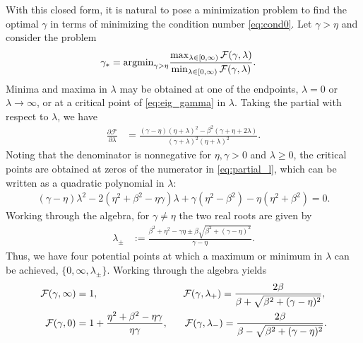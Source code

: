 \documentclass[a4paper,10pt]{article}
\begin{document}
With this closed form, it is natural to pose a minimization problem to find the
optimal $\gamma$ in terms of minimizing the condition number \eqref{eq:cond0}.
Let $\gamma > \eta$ and consider the problem
%
\begin{align}\label{eq:gam_opt}
\gamma_* & = \textnormal{argmin}_{\gamma>\eta}
	\frac{\max_{\lambda\in[0,\infty)} \mathcal{F}(\gamma,\lambda)}
		{\min_{\lambda\in[0,\infty)} \mathcal{F}(\gamma,\lambda)}.
\end{align}
%
Minima and maxima in $\lambda$ may be obtained at one of the endpoints,
$\lambda = 0$ or $\lambda\to\infty$, or at a critical point of \eqref{eq:eig_gamma}
in $\lambda$. Taking the partial with respect to $\lambda$, we have
%
\begin{align}\label{eq:partial_l}
\frac{\partial\mathcal{F}}{\partial\lambda} & =
	\frac{(\gamma-\eta)(\eta+\lambda)^2 - \beta^2(\gamma+\eta+2\lambda)}
		{(\gamma+\lambda)^2(\eta+\lambda)^2}.
\end{align}
%
Noting that the denominator is nonnegative for $\eta,\gamma>0$ and $\lambda \geq 0$,
the critical points are obtained at zeros of the numerator in \eqref{eq:partial_l},
which can be written as a quadratic polynomial in $\lambda$:
%
\begin{align*}
(\gamma-\eta)\lambda^2 - 2(\eta^2+\beta^2 - \eta\gamma)\lambda + 
	\gamma(\eta^2-\beta^2) - \eta(\eta^2+\beta^2) = 0.
\end{align*}
%
Working through the algebra, for $\gamma \neq \eta$ the two real roots are given by
%
\begin{align}\label{eq:roots}
\lambda_{\pm} & := \frac{\beta^2 + \eta^2 - \gamma\eta \pm
	\beta\sqrt{\beta^2 + (\gamma-\eta)^2}}{\gamma-\eta}.
\end{align}
%
Thus, we have four potential points at which a maximum or minimum in $\lambda$
can be achieved, $\{0,\infty, \lambda_\pm\}$. Working through the algebra yields
%
\begin{align}\label{eq:F_gamma}
\begin{split}
\mathcal{F}(\gamma,\infty) & = 1, \hspace{20ex}
\mathcal{F}(\gamma,\lambda_+) = \frac{2\beta}{\beta + \sqrt{\beta^2 + (\gamma-\eta)^2}}, \\
\mathcal{F}(\gamma,0) & = 1 + \frac{\eta^2+\beta^2-\eta\gamma}{\eta\gamma},
\hspace{4ex}
\mathcal{F}(\gamma,\lambda_-) = \frac{2\beta}{\beta - \sqrt{\beta^2 + (\gamma-\eta)^2}}.
\end{split}
\end{align}
%
\end{document}
